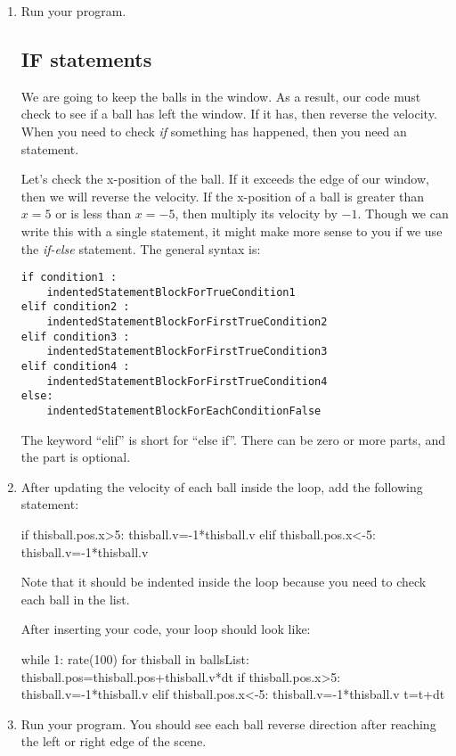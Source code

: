 \begin{enumerate}
\item Run your program.

\subsection*{IF statements}

We are going to keep the balls in the window. As a result, our code must check to see if a ball has left the window. If it has, then reverse the velocity. When you need to check \emph{if} something has happened, then you need an  statement.

Let's check the x-position of the ball. If it exceeds the edge of our window, then we will reverse the velocity. If the x-position of a ball is greater than $x=5$ or is less than $x=-5$, then multiply its velocity by $-1$. Though we can write this with a single  statement, it might make more sense to you if we use the \emph{if-else} statement. The general syntax is:

\begin{verbatim}
if condition1 :
    indentedStatementBlockForTrueCondition1
elif condition2 :
    indentedStatementBlockForFirstTrueCondition2
elif condition3 :
    indentedStatementBlockForFirstTrueCondition3
elif condition4 :
    indentedStatementBlockForFirstTrueCondition4
else:
    indentedStatementBlockForEachConditionFalse
\end{verbatim}

The keyword ``elif'' is short for ``else if''. There can be zero or more  parts, and the  part is optional.

\item After updating the velocity of each ball inside the  loop, add the following  statement:

\begin{myvpython}
        if thisball.pos.x>5:
            thisball.v=-1*thisball.v
        elif thisball.pos.x<-5:
            thisball.v=-1*thisball.v
\end{myvpython}

Note that it should be indented inside the  loop because you need to check each ball in the list.

After inserting your code, your  loop should look like:

\begin{myvpython}
while 1:
    rate(100)
    for thisball in ballsList:
        thisball.pos=thisball.pos+thisball.v*dt
        if thisball.pos.x>5:
            thisball.v=-1*thisball.v
        elif thisball.pos.x<-5:
            thisball.v=-1*thisball.v
    t=t+dt
\end{myvpython}

\item Run your program. You should see each ball reverse direction after reaching the left or right edge of the scene.

\end{enumerate}

